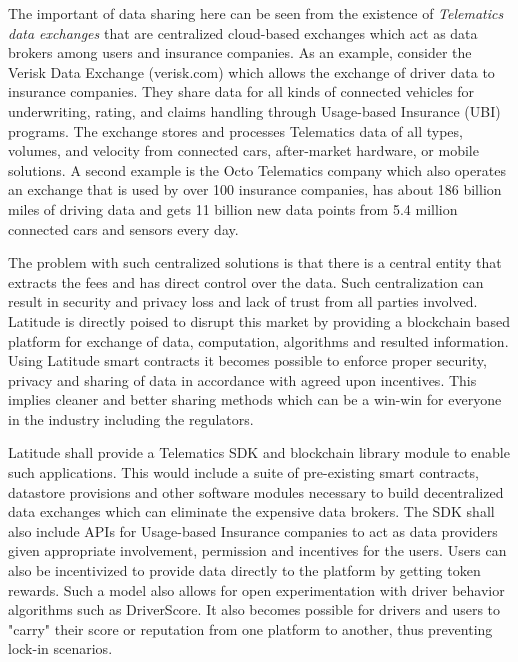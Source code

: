 The important of data sharing here can be seen from the existence of {\em Telematics data exchanges} that are
centralized cloud-based exchanges which act as data brokers among users and insurance companies. As an example, consider
the Verisk Data Exchange (verisk.com) which allows the exchange of driver data to insurance companies. They share data
for all kinds of connected vehicles for underwriting, rating, and claims handling through Usage-based Insurance (UBI)
programs.  The exchange stores and processes Telematics data of all types, volumes, and velocity from connected cars,
after-market hardware, or mobile solutions. A second example is the Octo Telematics company which also operates an
exchange that is used by over 100 insurance companies, has about 186 billion miles of driving data and gets 11 billion
new data points from 5.4 million connected cars and sensors every day.

The problem with such centralized solutions is that there is a central entity that extracts the fees and has direct
control over the data. Such centralization can result in security and privacy loss and lack of trust from all parties
involved. Latitude is directly poised to disrupt this market by providing a blockchain based platform for exchange of
data, computation, algorithms and resulted information. Using Latitude smart contracts it becomes possible to enforce
proper security, privacy and sharing of data in accordance with agreed upon incentives. This implies cleaner and better
sharing methods which can be a win-win for everyone in the industry including the regulators.

Latitude shall provide a Telematics SDK and blockchain library module to enable such applications. This would include a
suite of pre-existing smart contracts, datastore provisions and other software modules necessary to build decentralized
data exchanges which can eliminate the expensive data brokers. The SDK shall also include APIs for Usage-based Insurance
companies to act as data providers given appropriate involvement, permission and incentives for the users. Users can
also be incentivized to provide data directly to the platform by getting token rewards. Such a model also allows for
open experimentation with driver behavior algorithms such as DriverScore. It also becomes possible for drivers and users
to "carry" their score or reputation from one platform to another, thus preventing lock-in scenarios.

